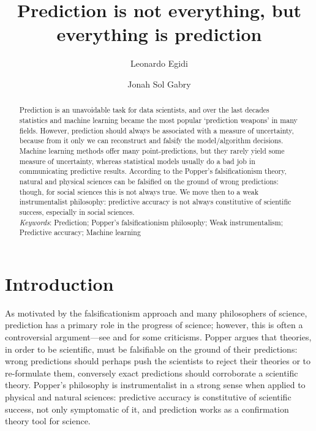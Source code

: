 \documentclass{statsoc}
\title[]{Prediction is not everything, but everything is prediction}
\author[Egidi and Gabry]{Leonardo Egidi}
\author[Egidi and Gabry]{Jonah Sol Gabry}
\begin{document}
\maketitle

\begin{abstract}
Prediction is an unavoidable task for data scientists, and over the last decades statistics and machine learning became the most popular `prediction weapons' in many fields. However, prediction should always be associated with a measure of uncertainty, because from it only we can reconstruct and 
falsify the model/algorithm decisions. Machine learning methods offer many point-predictions,  but they rarely yield some measure of uncertainty, whereas statistical 
models usually do a bad job in communicating predictive results.
According to the Popper's falsificationism theory, natural and physical sciences can be falsified on the ground of wrong predictions: though, for social sciences this is not always true.
We move then to a weak instrumentalist philosophy: predictive accuracy is not always constitutive of scientific success, especially in social sciences.\\

\emph{Keywords}: Prediction; Popper's falsificationism philosophy; Weak instrumentalism; Predictive accuracy; Machine learning

\end{abstract}

\section{Introduction}

As motivated by the falsificationism approach
\citep{popper1934logic} and many philosophers of science, prediction has a primary role in the progress of science; however, this is often a controversial argument---see \cite{kuhn1962structure} and \cite{lakatos1976falsification} for some criticisms. Popper argues 
that theories, in order to be scientific, must be falsifiable on the ground of their  predictions: wrong predictions should perhaps push the scientists to reject their theories or to 
re-formulate them, conversely exact predictions should corroborate a scientific theory. Popper's philosophy is instrumentalist 
in a strong sense \citep{hitchcock2004prediction} when applied to physical and natural sciences: predictive accuracy is constitutive of scientific success, not only symptomatic of it, and  prediction works as a confirmation theory tool for science.   
\end{document}

